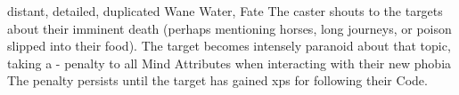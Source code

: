   {distant, detailed, duplicated}%
  {Wane}%
  {Water, Fate}%
  {}%
  {The caster shouts to the targets about their imminent death (perhaps mentioning horses, long journeys, or poison slipped into their food).
    The target becomes intensely paranoid about that topic, taking a - penalty to all Mind Attributes when interacting with their new phobia}%
  {
  The penalty persists until the target has gained  \glspl{xp} for following their Code.}

